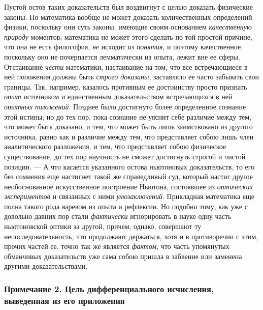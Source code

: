 Пустой остов таких доказательств был воздвигнут с целью доказать физические
законы. Но математика вообще не может доказать количественных определений
физики, поскольку они суть законы, имеющие своим основанием
{\em качественную природу} моментов; математика не
может этого сделать по той простой причине, что она не есть философия,
{\em не} исходит {\em из понятия},
и поэтому качественное, поскольку оно не почерпается лемматически из опыта,
лежит вне ее сферы. Отстаивание {\em чести} математики,
настаивание на том, что все встречающиеся в ней положения должны быть
{\em строго доказаны}, заставляло ее часто забывать
свои границы. Так, например, казалось противным ее достоинству просто
признать {\em опыт} источником и единственным
доказательством встречающихся в ней {\em опытных
}{\em положений}. Позднее было достигнуто более
определенное сознание этой истины; но до тех пор, пока сознание не уяснит
себе различие между тем, что может быть доказано, и тем, что может быть
лишь заимствовано из другого источника, равно как и различие между тем, что
представляет собою лишь член аналитического разложения, и тем, что
представляет собою физическое существование, до тех пор научность не сможет
достигнуть строгой и чистой позиции. — А что касается указанного остова
ньютоновых доказательств, то его без сомнения еще настигнет такой же
справедливый суд, который настиг другое необоснованное искусственное
построение Ньютона, состоявшее из {\em оптических
экспериментов} и связанных с ними {\em умозаключений}.
Прикладная математика еще полна такого рода варевом из опыта и рефлексии.
Но подобно тому, как уже с довольно давних пор стали
{\em фактически} игнорировать в науке одну часть
ньютоновской оптики за другой, причем, однако, совершают ту
непоследовательность, что продолжают держаться, хотя и в противоречии с
этим, прочих частей ее, точно так же является
{\em фактом}, что часть упомянутых обманчивых
доказательств уже сама собою пришла в забвение или заменена другими
доказательствами.

\subsubsection[Примечание 2. Цель дифференциального исчисления, выведенная из его приложения]
{Примечание 2. Цель дифференциального исчисления, выведенная из его приложения}

